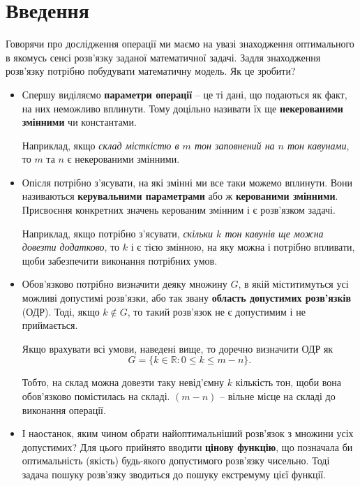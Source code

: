 \documentclass[a5paper,10pt]{book}
\newcommand\nonumchapter[1]{
 \chapter*{#1}
 \addcontentsline{toc}{section}{#1}
}
\begin{document}
\tableofcontents

\nonumchapter{Введення}

Говорячи про \flqq{}дослідження операції\frqq{} ми маємо на увазі знаходження оптимального в якомусь сенсі розв'язку заданої математичної задачі. Задля знаходження розв'язку потрібно побудувати математичну модель. Як це зробити?

\begin{itemize}

 \item
 
 Спершу виділяємо \textbf{параметри операції} -- це ті дані, що подаються як факт, на них неможливо вплинути. Тому доцільно називати їх ще \textbf{некерованими змінними} чи константами.
 
 Наприклад, якщо \textit{склад місткістю в $m$ тон заповнений на $n$ тон кавунами}, то $m$ та $n$ є некерованими змінними.

 \item
 
 Опісля потрібно з'ясувати, на які змінні ми все таки можемо вплинути. Вони називаються \textbf{керувальними параметрами} або ж \textbf{керованими змінними}. Присвоєння конкретних значень керованим змінним і є розв'язком задачі.
 
 Наприклад, якщо потрібно з'ясувати, \textit{скільки $k$ тон кавунів ще можна довезти додатково}, то $k$ і є тією змінною, на яку можна і потрібно впливати, щоби забезпечити виконання потрібних умов.
 
 \item
 
 Обов'язково потрібно визначити деяку множину $G$, в якій міститимуться усі можливі допустимі розв'язки, або так звану \textbf{область допустимих розв'язків} (ОДР). Тоді, якщо $k \notin G$, то такий розв'язок не є допустимим і не приймається.
 
 Якщо врахувати всі умови, наведені вище, то доречно визначити ОДР як $$ G = \{{k \in \mathbb{R}}:  {0 \leq k \leq m-n}\}. $$

 Тобто, на склад можна довезти таку невід'ємну $k$ кількість тон, щоби вона обов'язково помістилась на складі. $(m-n)$ -- вільне місце на складі до виконання операції.

 \item
 
 І наостанок, яким чином обрати найоптимальніший розв'язок з множини усіх допустимих? Для цього прийнято вводити \textbf{цінову функцію}, що позначала би оптимальність (якість) будь-якого допустимого розв'язку чисельно. Тоді задача пошуку розв'язку зводиться до пошуку екстремуму цієї функції.
 

\end{itemize}
\end{document}
